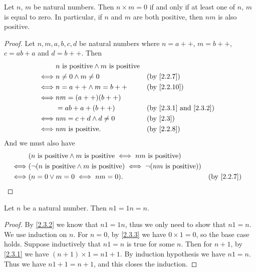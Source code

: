 \begin{lem}\label{2.3.3}
  Let \(n\), \(m\) be natural numbers.
  Then \(n \times m = 0\) if and only if at least one of \(n\), \(m\) is equal to zero.
  In particular, if \(n\) and \(m\) are both positive, then \(nm\) is also positive.
\end{lem}

\begin{proof}
  Let \(n, m, a, b, c, d\) be natural numbers where \(n = a++\), \(m = b++\), \(c = ab + a\) and \(d = b++\).
  Then
  \begin{align*}
         & n \text{ is positive} \land m \text{ is positive}                                                \\
    \iff & n \neq 0 \land m \neq 0                           &  & \by{2.2.7}                                \\
    \iff & n = a++ \land m = b++                             &  & \by{2.2.10}                               \\
    \iff & nm = (a++)(b++)                                                                                  \\
         & = ab + a + (b++)                                  &  & \text{(by \cref{2.3.1} and \cref{2.3.2})} \\
    \iff & nm = c + d \land d \neq 0                         &  & \text{(by \cref{2.3})}                    \\
    \iff & nm \text{ is positive}.                           &  & \by{2.2.8}
  \end{align*}
  And we must also have
  \begin{align*}
         & (n \text{ is positive} \land m \text{ is positive} \iff nm \text{ is positive})                                 \\
    \iff & (\lnot (n \text{ is positive} \land m \text{ is positive}) \iff \lnot (nm \text{ is positive}))                 \\
    \iff & (n = 0 \lor m = 0 \iff nm = 0).                                                                 &  & \by{2.2.7}
  \end{align*}
\end{proof}

\begin{ac}\label{ac:2.3.4}
  Let \(n\) be a natural number.
  Then \(n1 = 1n = n\).
\end{ac}

\begin{proof}
  By \cref{2.3.2} we know that \(n1 = 1n\), thus we only need to show that \(n1 = n\).
  We use induction on \(n\).
  For \(n=0\), by \cref{2.3.3} we have \(0 \times 1 = 0\), so the base case holds.
  Suppose inductively that \(n1 = n\) is true for some \(n\).
  Then for \(n + 1\), by \cref{2.3.1} we have \((n + 1) \times 1 = n1 + 1\).
  By induction hypothesis we have \(n1 = n\).
  Thus we have \(n1 + 1 = n + 1\), and this closes the induction.
\end{proof}

